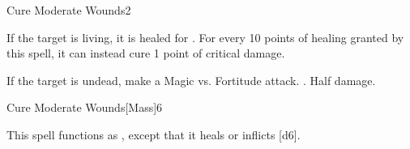 \begin{spellsection}{Cure Moderate Wounds}{2}
\begin{spellheader}
\end{spellheader}
\begin{spellcontent}
    \begin{spelltargetinginfo}
    \end{spelltargetinginfo}
    \begin{spelleffects}
        \spelleffect If the target is living, it is healed for . For every 10 points of healing granted by this spell, it can instead cure 1 point of critical damage.
        \begin{spellattacktriggered}{If the target is undead, make a Magic vs. Fortitude attack.}
            \spellsuccess {}.
            \spellfailure Half damage.
        \end{spellattacktriggered}
    \end{spelleffects}
\end{spellcontent}
\begin{spellfooter}
\end{spellfooter}
\end{spellsection}

\begin{spellsection}{Cure Moderate Wounds}[Mass]{6}
\begin{spellheader}
\end{spellheader}
\begin{spellcontent}
    \begin{spelltargetinginfo}
    \end{spelltargetinginfo}
    \begin{spelleffects}
        \spellspecial This spell functions as , except that it heals or inflicts [d6].
    \end{spelleffects}
\end{spellcontent}
\begin{spellfooter}
\end{spellfooter}
\end{spellsection}

